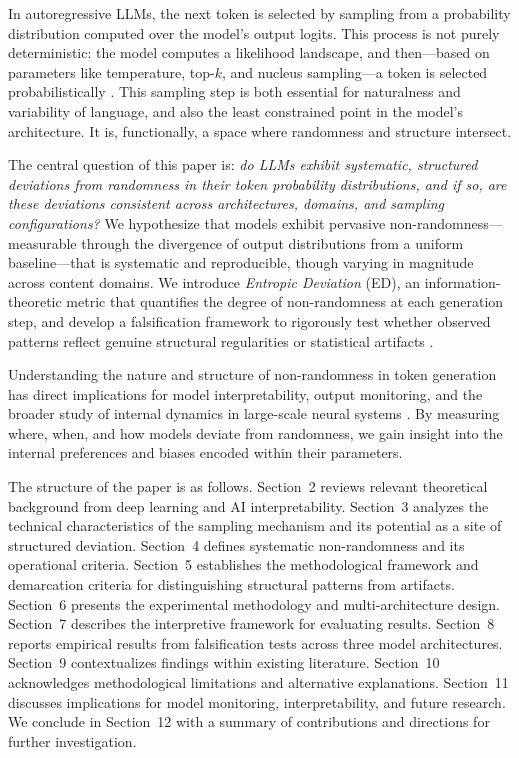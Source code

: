 \documentclass[12pt]{article}
\begin{document}
In autoregressive LLMs, the next token is selected by sampling from a probability distribution computed over the model’s output logits. This process is not purely deterministic: the model computes a likelihood landscape, and then---based on parameters like temperature, top-$k$, and nucleus sampling---a token is selected probabilistically \citep{bengio2013representation}. This sampling step is both essential for naturalness and variability of language, and also the least constrained point in the model’s architecture. It is, functionally, a space where randomness and structure intersect.

The central question of this paper is: \emph{do LLMs exhibit systematic, structured deviations from randomness in their token probability distributions, and if so, are these deviations consistent across architectures, domains, and sampling configurations?} We hypothesize that models exhibit pervasive non-randomness---measurable through the divergence of output distributions from a uniform baseline---that is systematic and reproducible, though varying in magnitude across content domains. We introduce \emph{Entropic Deviation} (ED), an information-theoretic metric that quantifies the degree of non-randomness at each generation step, and develop a falsification framework to rigorously test whether observed patterns reflect genuine structural regularities or statistical artifacts \citep{ganguli2022predictability}.

Understanding the nature and structure of non-randomness in token generation has direct implications for model interpretability, output monitoring, and the broader study of internal dynamics in large-scale neural systems \citep{olah2020zoom}. By measuring where, when, and how models deviate from randomness, we gain insight into the internal preferences and biases encoded within their parameters.

The structure of the paper is as follows. Section~2 reviews relevant theoretical background from deep learning and AI interpretability. Section~3 analyzes the technical characteristics of the sampling mechanism and its potential as a site of structured deviation. Section~4 defines systematic non-randomness and its operational criteria. Section~5 establishes the methodological framework and demarcation criteria for distinguishing structural patterns from artifacts. Section~6 presents the experimental methodology and multi-architecture design. Section~7 describes the interpretive framework for evaluating results. Section~8 reports empirical results from falsification tests across three model architectures. Section~9 contextualizes findings within existing literature. Section~10 acknowledges methodological limitations and alternative explanations. Section~11 discusses implications for model monitoring, interpretability, and future research. We conclude in Section~12 with a summary of contributions and directions for further investigation.
\end{document}

